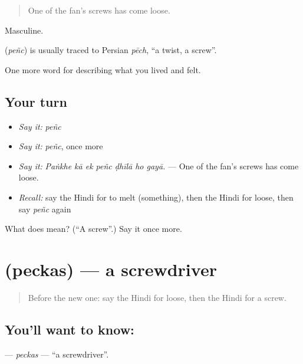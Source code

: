 \begin{quote}
One of the fan's screws has come loose.
\end{quote}

Masculine.

\begin{cousinweb}
\textbf{} (\emph{peñc}) is usually traced to Persian \emph{pēch}, \textquotedblleft{}a twist, a screw\textquotedblright{}.
\end{cousinweb}

\begin{grammarlens}[title={What you've built}]
One more word for describing what you lived and felt.
\end{grammarlens}

\subsection*{Your turn}
\begin{itemize}
\raggedright
  \item \emph{Say it:} \emph{peñc}
  \item \emph{Say it:} \emph{peñc}, once more
  \item \emph{Say it:} \emph{Paṅkhe kā ek peñc ḍhīlā ho gayā.} — One of the fan's screws has come loose.
  \item \emph{Recall:} say the Hindi for to melt (something), then the Hindi for loose, then say \emph{peñc} again
\end{itemize}

\begin{tcolorbox}[breakable,colback=teal!4,colframe=teal!35!black,title={Before you move on}]
What does  mean? (\textquotedblleft{}A screw\textquotedblright{}.) Say it once more.
\end{tcolorbox}
\section[\texorpdfstring{\hi{पेचकस} (peckas)}{पेचकस (peckas)}]{ (peckas) — a screwdriver}

\label{lesson:HI-C515-peckas}



\begin{quote}
Before the new one: say the Hindi for loose, then the Hindi for a screw.
\end{quote}

\subsection*{You'll want to know: }
\textbf{} — \emph{peckas} — \textquotedblleft{}a screwdriver\textquotedblright{}.

